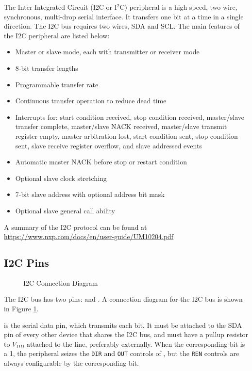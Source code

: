 The Inter-Integrated Circuit (I2C or I$^2$C) peripheral is a high speed, two-wire, synchronous, multi-drop serial interface. It transfers one bit at a time in a single direction. The I2C bus requires two wires, SDA and SCL. The main features of the I2C peripheral are listed below:

\begin{itemize}
	\item Master or slave mode, each with transmitter or receiver mode
	\item 8-bit transfer lengths
	\item Programmable transfer rate
	\item Continuous transfer operation to reduce dead time
	\item Interrupts for: start condition received, stop condition received, master/slave transfer complete, master/slave NACK received, master/slave transmit register empty, master arbitration lost, start condition sent, stop condition sent, slave receive register overflow, and slave addressed events
	\item Automatic master NACK before stop or restart condition
	\item Optional slave clock stretching
	\item 7-bit slave address with optional address bit mask
	\item Optional slave general call ability
\end{itemize}

A summary of the I2C protocol can be found at {\color{blue}\href{https://www.nxp.com/docs/en/user-guide/UM10204.pdf}{\ul{https://www.nxp.com/docs/en/user-guide/UM10204.pdf}}}


\subsection{I2C Pins}

\begin{figure}[h]
	
	\caption{I2C Connection Diagram}
	\label{fig:i2c-connection-diagram}
\end{figure}

The I2C bus has two pins:  and . A connection diagram for the I2C bus is shown in Figure \ref{fig:i2c-connection-diagram}.

 is the serial data pin, which transmits each bit. It must be attached to the SDA pin of every other device that shares the I2C bus, and must have a pullup resistor to $V_{DD}$ attached to the line, preferably externally. When the corresponding  bit is a 1, the  peripheral seizes the \texttt{DIR} and \texttt{OUT} controls of , but the \texttt{REN} controls are always configurable by the corresponding  bit.

